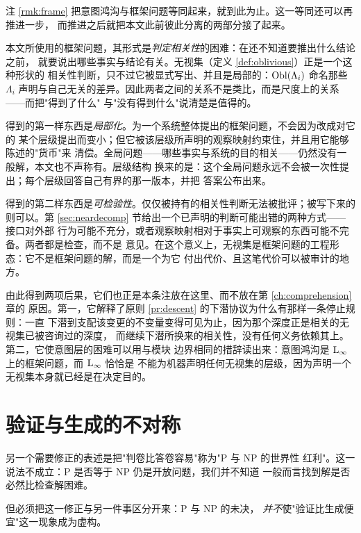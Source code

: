 \begin{remark}[无视集是框架问题被逐层级偿付之处]\label{rmk:frame-per-level}
注 \ref{rmk:frame} 把意图鸿沟与框架问题等同起来，就到此为止。这一等同还可以再推进一步，
而推进之后就把本文此前彼此分离的两部分接了起来。

本文所使用的框架问题，其形式是\emph{判定相关性}的困难：在还不知道要推出什么结论之前，
就要说出哪些事实与结论有关。无视集（定义 \ref{def:oblivious}）正是一个这种形状的
相关性判断，只不过它被显式写出、并且是局部的：$\operatorname{Obl}(\Lambda_i)$ 命名那些 $\Lambda_i$
声明与自己无关的差异。因此两者之间的关系不是类比，而是尺度上的关系——而把"得到了什么"
与"没有得到什么"说清楚是值得的。

得到的第一样东西是\emph{局部化}。为一个系统整体提出的框架问题，不会因为改成对它的
某个层级提出而变小；但它被该层级所声明的观察映射约束住，并且用它能够陈述的"货币"来
清偿。全局问题——哪些事实与系统的目的相关——仍然没有一般解，本文也不声称有。层级结构
换来的是：这个全局问题永远不会被一次性提出；每个层级回答自己有界的那一版本，并把
答案公布出来。

得到的第二样东西是\emph{可检验性}。仅仅被持有的相关性判断无法被批评；被写下来的
则可以。第 \ref{sec:neardecomp} 节给出一个已声明的判断可能出错的两种方式——接口对外部
行为可能不充分，或者观察映射相对于事实上可观察的东西可能不完备。两者都是检查，而不是
意见。在这个意义上，无视集是框架问题的工程形态：它不是框架问题的解，而是一个为它
付出代价、且这笔代价可以被审计的地方。

由此得到两项后果，它们也正是本条注放在这里、而不放在第 \ref{ch:comprehension} 章的
原因。第一，它解释了原则 \ref{pr:descent} 的下潜协议为什么有那样一条停止规则：一直
下潜到支配该变更的不变量变得可见为止，因为那个深度正是相关的无视集已被咨询过的深度，
而继续下潜所换来的相关性，没有任何义务依赖其上。第二，它使意图层的困难可以用与模块
边界相同的措辞读出来：意图鸿沟是 $\mathrm{L}_{\infty}$ 上的框架问题，而 $\mathrm{L}_{\infty}$ 恰恰是
不能为机器声明任何无视集的层级，因为声明一个无视集本身就已经是在决定目的。
\end{remark}

\section{验证与生成的不对称}\label{sec:asymmetry}

另一个需要修正的表述是把"判卷比答卷容易"称为"$\mathrm{P}$ 与 $\mathrm{NP}$ 的世界性
红利"。这一说法不成立：$\mathrm{P}$ 是否等于 $\mathrm{NP}$ 仍是开放问题，我们并不知道
一般而言找到解是否必然比检查解困难。

但必须把这一修正与另一件事区分开来：$\mathrm{P}$ 与 $\mathrm{NP}$ 的未决，
\emph{并不}使"验证比生成便宜"这一现象成为虚构。

